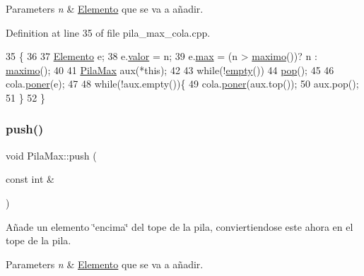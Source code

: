 \begin{DoxyParams}{Parameters}
{\em n} & \hyperlink{structElemento}{Elemento} que se va a añadir. \\
\hline
\end{DoxyParams}


Definition at line 35 of file pila\+\_\+max\+\_\+cola.\+cpp.


\begin{DoxyCode}
35                                \{
36 
37   \hyperlink{structElemento}{Elemento} e;
38   e.\hyperlink{structElemento_a2fd2452d8e9cbe64efec8ca6c7f7b7eb}{valor} = n;
39   e.\hyperlink{structElemento_a9971eb72e5c21f568f1135947c3919f7}{max} = (n > \hyperlink{classPilaMax_aeed1b737e5130f0d281b90303e1cf9bd}{maximo}())? n : \hyperlink{classPilaMax_aeed1b737e5130f0d281b90303e1cf9bd}{maximo}();
40 
41   \hyperlink{classPilaMax}{PilaMax} aux(*\textcolor{keyword}{this});
42 
43   \textcolor{keywordflow}{while}(!\hyperlink{classPilaMax_ab31ac009a1c761470cf3cac634396694}{empty}())
44     \hyperlink{classPilaMax_ac728a5593dbd9acb5d400f416e680736}{pop}();
45 
46   cola.\hyperlink{classCola_a4a902e5805ae74f8d80c6f3267fd14c4}{poner}(e);
47 
48   \textcolor{keywordflow}{while}(!aux.empty())\{
49     cola.\hyperlink{classCola_a4a902e5805ae74f8d80c6f3267fd14c4}{poner}(aux.top());
50     aux.pop();
51   \}
52 \}
\end{DoxyCode}
\mbox{\label{classPilaMax_a68d85126d08a5a73bce655390e5bf2d7}} 
\subsubsection{\texorpdfstring{push()}{push()}\hspace{0.1cm}{\footnotesize\ttfamily [2/2]}}
{\footnotesize\ttfamily void Pila\+Max\+::push (\begin{DoxyParamCaption}\item[{const int \&}]{ }\end{DoxyParamCaption})}



Añade un elemento \char`\"{}encima\char`\"{} del tope de la pila, conviertiendose este ahora en el tope de la pila. 


\begin{DoxyParams}{Parameters}
{\em n} & \hyperlink{structElemento}{Elemento} que se va a añadir. \\
\hline
\end{DoxyParams}
\mbox{\label{classPilaMax_ab920daacfaac5fceda9aa9b1b28b869a}} 
